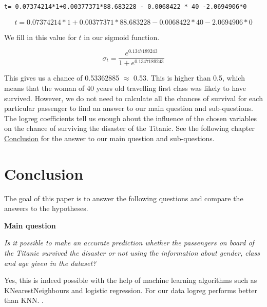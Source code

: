 \documentclass[11pt]{article}
\begin{document}
\begin{verbatim}
t= 0.07374214*1+0.00377371*88.683228 - 0.0068422 * 40 -2.0694906*0

\end{verbatim}

\begin{equation}
t= 0.07374214*1+0.00377371*88.683228 - 0.0068422 * 40 -2.0694906*0
\end{equation}

We fill in this value for \(t\) in our sigmoid function. 


\begin{equation}
\label{sigmoid}
\sigma_t = \frac{e^{0.1347189243}}{1+e^{0.1347189243}}
\end{equation}

This gives us a chance of 0.53362885 \(\approx\) 0.53. This is higher than 0.5, which means that the woman of 40 years old travelling first class was likely to have survived. However, we do not need to calculate all the chances of survival for each particular passenger to find an answer to our main question and sub-questions. The logreg coefficients tell us enough about the influence of the chosen variables on the chance of surviving the disaster of the Titanic. See the following chapter \hyperref[sec:conclusion]{Conclusion} for the answer to our main question and sub-questions.  





















\newpage
\section{Conclusion}
\label{sec:org2b1ab80}
\label{sec:conclusion}
The goal of this paper is to answer the following questions and compare the answers to the hypotheses. 

\textbf{Main question}

\emph{Is it possible to make an accurate prediction whether the passengers on board of the Titanic survived the disaster or not using the information about gender, class and age given in the dataset?}

Yes, this is indeed possible with the help of machine learning algorithms such as KNearestNeighbours and logistic regression. For our data logreg performs better than KNN. . 
\end{document}

